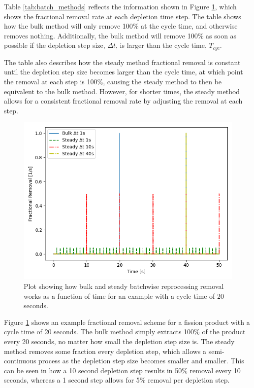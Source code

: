Table \ref{tab:batch_methods} reflects the information shown in Figure \ref{fig:bulk_repr_cnst}, which shows the fractional removal rate at each depletion time step. The table shows how the bulk method will only remove 100\% at the cycle time, and otherwise removes nothing. Additionally, the bulk method will remove 100\% as soon as possible if the depletion step size, $\Delta t$, is larger than the cycle time, $T_{cyc}$. 

The table also describes how the steady method fractional removal is constant until the depletion step size becomes larger than the cycle time, at which point the removal at each step is 100\%, causing the steady method to then be equivalent to the bulk method. However, for shorter times, the steady method allows for a consistent fractional removal rate by adjusting the removal at each step.


\begin{figure}[H]
  \centering
  \includegraphics[scale=0.75]{images/bulk-compare-cycles.png}
  \caption{Plot showing how bulk and steady batchwise reprocessing removal works as a function of time for an example with a cycle time of 20 seconds.}
   \label{fig:bulk_repr_cnst}
\end{figure}

Figure \ref{fig:bulk_repr_cnst} shows an example fractional removal scheme for a fission product with a cycle time of 20 seconds. The bulk method simply extracts 100\% of the product every 20 seconds, no matter how small the depletion step size is. The steady method removes some fraction every depletion step, which allows a semi-continuous process as the depletion step size becomes smaller and smaller. This can be seen in how a 10 second depletion step results in 50\% removal every 10 seconds, whereas a 1 second step allows for 5\% removal per depletion step.


